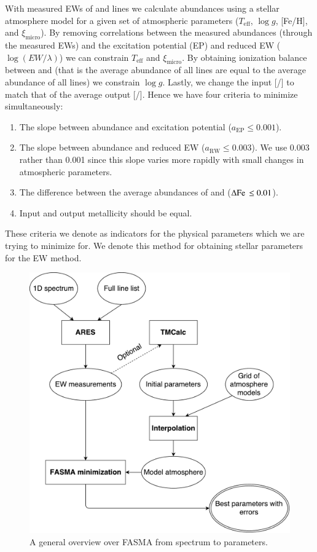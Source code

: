 \documentclass{aa}
\begin{document}
With measured EWs of  and  lines we calculate abundances
using a stellar atmosphere model for a given set of atmospheric parameters
($T_\mathrm{eff}$, $\log g$, [Fe/H], and $\xi_\mathrm{micro}$). By removing
correlations between the measured abundances (through the measured EWs) and the
excitation potential (EP) and reduced EW ($\log(EW/\lambda)$) we can constrain
$T_\mathrm{eff}$ and $\xi_\mathrm{micro}$. By obtaining ionization balance
between  and  (that is the average abundance of all
 lines are equal to the average abundance of all  lines)
we constrain $\log g$. Lastly, we change the input [/] to match
that of the average output [/]. Hence we have four criteria to
minimize simultaneously:

\begin{enumerate}
    \item The slope between abundance and excitation potential ($a_\mathrm{EP}\le0.001$).
    \item The slope between abundance and reduced EW ($a_\mathrm{RW}\le0.003$).
          We use 0.003 rather than 0.001 since this slope varies more rapidly
          with small changes in atmospheric parameters.
    \item The difference between the average abundances of  and
           ($\Delta\ion{Fe}{}\le0.01$).
    \item Input and output metallicity should be equal.
\end{enumerate}
These criteria we denote as indicators for the physical parameters which we are
trying to minimize for. We denote this method for obtaining stellar parameters
for the EW method.

\begin{figure}[tpb]
    \centering
    \includegraphics[width=1.0\linewidth]{figures/FASMA_general.pdf}
    \caption{A general overview over FASMA from spectrum to parameters.}
    \label{fig:FASMA_general}
\end{figure}
\end{document}
